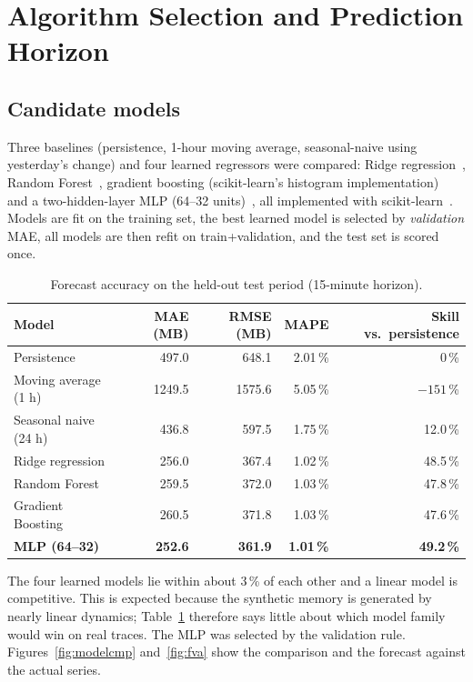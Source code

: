 \documentclass[11pt,a4paper]{article}
\begin{document}
\section{Algorithm Selection and Prediction Horizon}\label{sec:algo}
\subsection{Candidate models}
Three baselines (persistence, 1-hour moving average, seasonal-naive using yesterday's change) and four learned regressors were compared: Ridge regression~\cite{hoerl1970}, Random Forest~\cite{breiman2001}, gradient boosting (scikit-learn's histogram implementation)~\cite{friedman2001} and a two-hidden-layer MLP (64--32 units)~\cite{rumelhart1986}, all implemented with scikit-learn~\cite{pedregosa2011}. Models are fit on the training set, the best learned model is selected by \emph{validation} MAE, all models are then refit on train+validation, and the test set is scored once.

\begin{table}[H]
\centering\caption{Forecast accuracy on the held-out test period (15-minute horizon).}\label{tab:models}
\begin{tabular}{lrrrr}
\toprule
Model & MAE (MB) & RMSE (MB) & MAPE & Skill vs.\ persistence\\
\midrule
Persistence & 497.0 & 648.1 & 2.01\,\% & 0\,\%\\
Moving average (1 h) & 1249.5 & 1575.6 & 5.05\,\% & $-151$\,\%\\
Seasonal naive (24 h) & 436.8 & 597.5 & 1.75\,\% & 12.0\,\%\\
Ridge regression & 256.0 & 367.4 & 1.02\,\% & 48.5\,\%\\
Random Forest & 259.5 & 372.0 & 1.03\,\% & 47.8\,\%\\
Gradient Boosting & 260.5 & 371.8 & 1.03\,\% & 47.6\,\%\\
\textbf{MLP (64--32)} & \textbf{252.6} & \textbf{361.9} & \textbf{1.01\,\%} & \textbf{49.2\,\%}\\
\bottomrule
\end{tabular}
\end{table}

The four learned models lie within about 3\,\% of each other and a linear model is competitive. This is expected because the synthetic memory is generated by nearly linear dynamics; Table~\ref{tab:models} therefore says little about which model family would win on real traces. The MLP was selected by the validation rule. Figures~\ref{fig:modelcmp} and~\ref{fig:fva} show the comparison and the forecast against the actual series.
\end{document}
